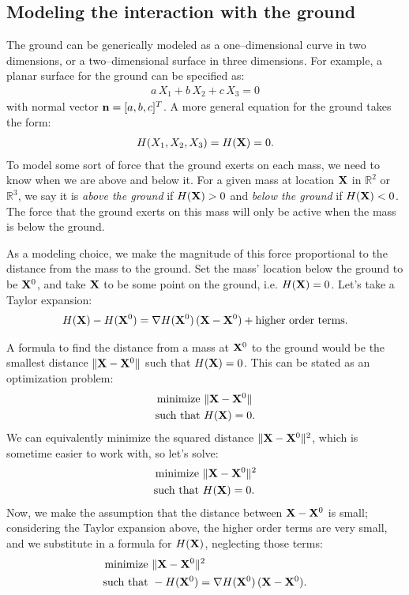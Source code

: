 \documentclass[10pt]{article}
\begin{document}
\subsection{Modeling the interaction with the ground}

The ground can be generically modeled as a one--dimensional curve in two dimensions, or a two--dimensional surface in three dimensions.  For example, a planar surface for the ground can be specified as:
\begin{align*}
a \, X_1 + b\, X_2 + c \,X_3 = 0
\end{align*}
with normal vector ${\bf n} = [a,b,c]^T$.  A more general equation for the ground takes the form:
\begin{align*}
H(X_1,X_2,X_3) = H({\bf X}) = 0.
\end{align*}
To model some sort of force that the ground exerts on each mass, we need to know when we are above and below it.  For a given mass at location ${\bf X}$ in $\mathbb{R}^2$ or $\mathbb{R}^3$, we say it is {\em above the ground} if $H({\bf X}) > 0$ and {\em below the ground} if $H({\bf X}) < 0$.  The force that the ground exerts on this mass will only be active when the mass is below the ground.

As a modeling choice, we make the magnitude of this force proportional to the distance from the mass to the ground.  Set the mass' location below the ground to be ${\bf X}^0$, and take ${\bf X}$ to be some point on the ground, i.e. $H({\bf X}) = 0$.  Let's take a Taylor expansion:
\begin{align*}
H({\bf X}) - H({\bf X}^0) = \nabla H({\bf X}^0) \, ({\bf X} - {\bf X}^0) + \text{higher order terms}. 
\end{align*}  

A formula to find the distance from a mass at ${\bf X}^0$ to the ground would be the smallest distance $\|{\bf X} - {\bf X}^0\|$ such that $H({\bf X}) = 0$.  This can be stated as an optimization problem:
\begin{align*}
\text{minimize } &\|{\bf X} - {\bf X}^0\| \\
\text{such that } &H({\bf X}) = 0.
\end{align*}
We can equivalently minimize the squared distance $\|{\bf X} - {\bf X}^0\|^2$, which is sometime easier to work with, so let's solve:
\begin{align*}
\text{minimize } &\|{\bf X} - {\bf X}^0\|^2 \\
\text{such that } &H({\bf X}) = 0.
\end{align*}
Now, we make the assumption that the distance between ${\bf X} - {\bf X}^0$ is small; considering the Taylor expansion above, the higher order terms are very small, and we substitute in a formula for $H({\bf X})$, neglecting those terms: 
\begin{align*}
\text{minimize } &\|{\bf X} - {\bf X}^0\|^2 \\
\text{such that } &-H({\bf X}^0) = \nabla H({\bf X}^0) \, ({\bf X} - {\bf X}^0).
\end{align*}
\end{document}
